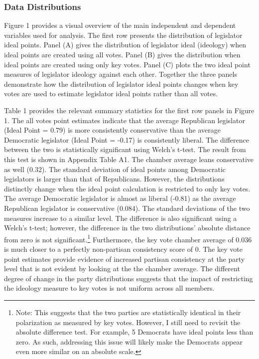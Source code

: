 \documentclass[10pt,letterpaper]{article}
\begin{document}
\subsubsection{Data Distributions}
Figure 1 provides a visual overview of the main independent and dependent variables used for analysis. The first row presents the distribution of legislator ideal points. Panel (A) gives the distribution of legislator ideal (ideology) when ideal points are created using all votes. Panel (B) gives the distribution when ideal points are created using only key votes. Panel (C) plots the two ideal point measures of legislator ideology against each other. Together the three panels demonstrate how the distribution of legislator ideal points changes when key votes are used to estimate legislator ideal points rather than all votes.
 
Table 1 provides the relevant summary statistics for the first row panels in Figure 1. The all votes point estimates indicate that the average Republican legislator (Ideal Point = 0.79) is more consistently conservative than the average Democratic legislator (Ideal Point = -0.17) is consistently liberal. The difference between the two is statistically significant using Welch's t-test. The result from this test is shown in Appendix Table A1. The chamber average leans conservative as well (0.32). The standard deviation of ideal points among Democratic legislators is larger than that of Republicans. However, the distributions distinctly change when the ideal point calculation is restricted to only key votes. The average Democratic legislator is almost as liberal (-0.81) as the average Republican legislator is conservative (0.084). The standard deviations of the two measures increase to a similar level. The difference is also significant using a Welch's t-test; however, the difference in the two distributions' absolute distance from zero is not significant.\footnote{Note: This suggests that the two parties are statistically identical in their polarization as measured by key votes. However, I still need to revisit the absolute difference test. For example, 5 Democrats have ideal points less than zero. As such, addressing this issue will likely make the Democrats appear even more similar on an absolute scale.} Furthermore, the key vote chamber average of 0.036 is much closer to a perfectly non-partisan consistency score of 0. The key vote point estimates provide evidence of increased partisan consistency at the party level that is not evident by looking at the the chamber average. The different degree of change in the party distributions suggests that the impact of restricting the ideology measure to key votes is not uniform across all members.
\end{document}
